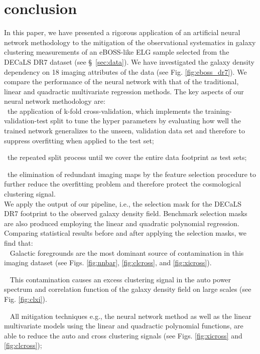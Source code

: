 \documentclass[fleqn, usenatbib]{mnras}
\begin{document}
\section{conclusion}\label{sec:conclusion}
In this paper, we have presented a rigorous application of an artificial neural network methodology to the mitigation of the observational systematics in galaxy clustering measurements of an eBOSS-like ELG sample selected from the DECaLS DR7 dataset (see \S~\ref{sec:data}). We have investigated the galaxy density dependency on 18 imaging attributes of the data (see Fig. \ref{fig:eboss_dr7}). We compare the performance of the neural network with that of the traditional, linear and quadractic multivariate regression methods. The key aspects of our neural network methodology are:\\

\textbullet ~the application of k-fold cross-validation, which implements the training-validation-test split to tune the hyper parameters by evaluating how well the trained network generalizes to the unseen,  validation data set and therefore to suppress overfitting when applied to the test set;

\textbullet ~the repeated split process until we cover the entire data footprint as test sets;

\textbullet ~the elimination of redundant imaging maps by the feature selection procedure to further reduce the overfitting problem and therefore protect the cosmological clustering signal.\\

We apply the output of our pipeline, i.e., the selection mask for the DECaLS DR7 footprint to the observed galaxy density field. Benchmark selection masks are also produced employing the linear and quadratic polynomial regression. Comparing statistical results before and after applying the selection masks, we find that:\\

\textbullet ~  Galactic foregrounds are the most dominant source of contamination in this imaging dataset (see Figs. \ref{fig:nnbar}, \ref{fig:clcross}, and \ref{fig:xicross}).

\textbullet ~    This contamination causes an excess clustering signal in the auto power spectrum and correlation function of the galaxy density field on large scales (see Fig. \ref{fig:clxi}).

\textbullet ~    All mitigation techniques e.g., the neural network method as well as the linear multivariate models using the linear and quadractic polynomial functions, are able to reduce the auto and cross clustering signals (see Figs. \ref{fig:xicross} and \ref{fig:clcross}); 
\end{document}
